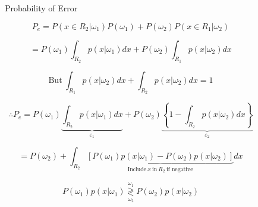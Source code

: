 \documentclass[fleqn]{article}
\newcommand{\decisionbound}{\overset{\omega_1}{\underset{\omega_2}{\gtrless}}}
\begin{document}
	\begin{figure}[H]
		\centerline{}
		\caption{Probability of Error}
		\label{prob_error}
	\end{figure}
	
	\begin{equation*}
		P_e = P(x \in R_2 | \omega_1)P(\omega_1) + P(\omega_2)P(x \in R_1 | \omega_2)
	\end{equation*}
	
	\begin{equation*}
		= P(\omega_1)\int_{R_2}{p(x|\omega_1)dx} + P(\omega_2)\int_{R_1}{p(x|\omega_2)dx}
	\end{equation*}
	
	\begin{equation*}
		\text{But}\ \int_{R_1}p(x|\omega_2)dx + \int_{R_2}p(x|\omega_2)dx = 1
	\end{equation*}
	
	\begin{equation*}
		\therefore P_e = P(\omega_1)\underbrace{\int_{R_2}p(x|\omega_1)dx}_{\varepsilon_1} + P(\omega_2)\underbrace{\left\{1 - \int_{R_2}p(x|\omega_2)dx\right\}}_{\varepsilon_2}
	\end{equation*}
	
	\begin{equation*}
		= P(\omega_2) + \int_{R_2}\underbrace{\left[P(\omega_1)p(x|\omega_1) - P(\omega_2)p(x|\omega_2)\right]}_{\text{Include}\ x\ \text{in}\ R_2\ \text{if negative}}dx
	\end{equation*}
	
	\begin{equation*}
		P(\omega_1)p(x|\omega_1) \decisionbound P(\omega_2)p(x|\omega_2)
	\end{equation*}
\end{document}
